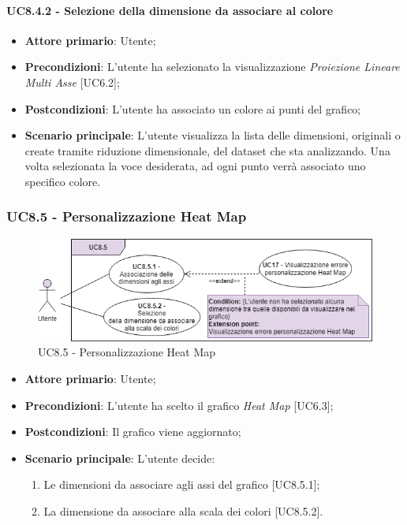 \paragraph{UC8.4.2 - Selezione della dimensione da associare al colore}
\begin{itemize}
	\item \textbf{Attore primario}: Utente;
	\item \textbf{Precondizioni}: L'utente ha selezionato la visualizzazione \textit{Proiezione Lineare Multi Asse} [UC6.2];
	\item \textbf{Postcondizioni}: L'utente ha associato un colore ai punti del grafico;
	
	\item \textbf{Scenario principale}: L'utente visualizza la lista delle dimensioni, originali o create tramite riduzione dimensionale, del dataset che sta analizzando. Una volta selezionata la voce desiderata, ad ogni punto verrà associato uno specifico colore. 
\end{itemize}

\subsubsection{UC8.5 - Personalizzazione Heat Map}
\begin{figure}[h]
\includegraphics[width=\linewidth]{Section/Images/UC8.5.png}
\centering
\caption{UC8.5 - Personalizzazione Heat Map}
\end{figure}
\begin{itemize}
	\item \textbf{Attore primario}: Utente;
	
	\item \textbf{Precondizioni}: L'utente ha scelto il grafico \textit{Heat Map} [UC6.3];
	
	\item \textbf{Postcondizioni}: Il grafico viene aggiornato;
	
	\item \textbf{Scenario principale}: L'utente decide:
	
\begin{enumerate}
\item Le dimensioni da associare agli assi del grafico [UC8.5.1];
\item La dimensione da associare alla scala dei colori [UC8.5.2].
\end{enumerate}	
		
\end{itemize}

